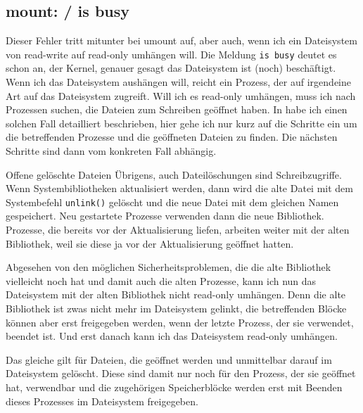 \subsection*{mount: / is busy}
\label{sec:mount-is-busy}
\begin{normaltext}
  Dieser Fehler tritt mitunter bei umount auf, aber auch, wenn ich ein
  Dateisystem von read-write auf read-only umhängen will.
  Die Meldung \verb?is busy? deutet es schon an, der Kernel, genauer gesagt
  das Dateisystem ist (noch) beschäftigt. Wenn ich das Dateisystem aushängen
  will, reicht ein Prozess, der auf irgendeine Art auf das Dateisystem
  zugreift. Will ich es read-only umhängen, muss ich nach Prozessen suchen,
  die Dateien zum Schreiben geöffnet haben. In \cite{weidner12:linuxkopflos}
  habe ich einen solchen Fall detailliert beschrieben, hier gehe ich nur kurz
  auf die Schritte ein um die betreffenden Prozesse und die geöffneten Dateien
  zu finden. Die nächsten Schritte sind dann vom konkreten Fall abhängig.

  \begin{Exkursbox}{Offene gelöschte Dateien}
    Übrigens, auch Dateilöschungen sind Schreibzugriffe. Wenn
    Systembibliotheken aktualisiert werden, dann wird die alte Datei mit dem
    Systembefehl \verb?unlink()? gelöscht und die neue Datei mit dem gleichen
    Namen gespeichert. Neu gestartete Prozesse verwenden dann die neue
    Bibliothek. Prozesse, die bereits vor der Aktualisierung liefen, arbeiten
    weiter mit der alten Bibliothek, weil sie diese ja vor der Aktualisierung
    geöffnet hatten.
    
    Abgesehen von den möglichen Sicherheitsproblemen, die die alte Bibliothek
    vielleicht noch hat und damit auch die alten Prozesse, kann ich nun das
    Dateisystem mit der alten Bibliothek nicht read-only umhängen. Denn die
    alte Bibliothek ist zwas nicht mehr im Dateisystem gelinkt, die
    betreffenden Blöcke können aber erst freigegeben werden, wenn der letzte
    Prozess, der sie verwendet, beendet ist. Und erst danach kann ich das
    Dateisystem read-only umhängen.

    Das gleiche gilt für Dateien, die geöffnet werden und unmittelbar darauf
    im Dateisystem gelöscht. Diese sind damit nur noch für den Prozess, der
    sie geöffnet hat, verwendbar und die zugehörigen Speicherblöcke werden
    erst mit Beenden dieses Prozesses im Dateisystem freigegeben.
  \end{Exkursbox}


\end{normaltext}
